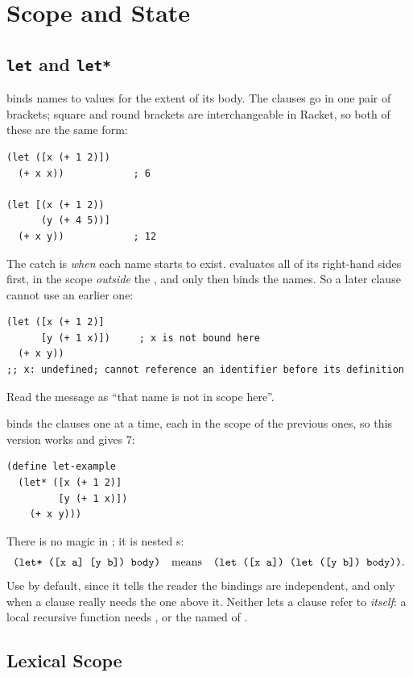 \section{Scope and State}
\label{sec:scopestate}

\subsection{\texttt{let} and \texttt{let*}}

 binds names to values for the extent of its body. The clauses go in one pair of brackets; square and round brackets are interchangeable in Racket, so both of these are the same form:
\begin{lstlisting}
(let ([x (+ 1 2)])
  (+ x x))            ; 6

(let [(x (+ 1 2))
      (y (+ 4 5))]
  (+ x y))            ; 12
\end{lstlisting}

The catch is \emph{when} each name starts to exist.  evaluates all of its right-hand sides first, in the scope \emph{outside} the , and only then binds the names. So a later clause cannot use an earlier one:
\begin{lstlisting}
(let ([x (+ 1 2)]
      [y (+ 1 x)])     ; x is not bound here
  (+ x y))
;; x: undefined; cannot reference an identifier before its definition
\end{lstlisting}
Read the message as ``that name is not in scope here''.

 binds the clauses one at a time, each in the scope of the previous ones, so this version works and gives 7:
\begin{lstlisting}
(define let-example
  (let* ([x (+ 1 2)]
         [y (+ 1 x)])
    (+ x y)))
\end{lstlisting}
There is no magic in ; it is nested s:
\[
\texttt{(let* ([x a] [y b]) body)} \quad\text{means}\quad \texttt{(let ([x a]) (let ([y b]) body))}.
\]
Use  by default, since it tells the reader the bindings are independent, and  only when a clause really needs the one above it. Neither lets a clause refer to \emph{itself}: a local recursive function needs , or the named  of .

\subsection{Lexical Scope}


